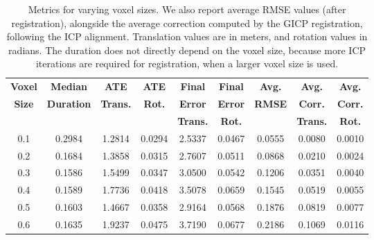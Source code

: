 \begin{table}[h]
    \centering
    \begin{tabular}{c|cccccccc}
        \hline
        \textbf{Voxel} & \textbf{Median}   & \textbf{ATE}    & \textbf{ATE}  & \textbf{Final } & \textbf{Final} & \textbf{Avg.} & \textbf{Avg.}   & \textbf{Avg.}  \\
        \textbf{Size}  & \textbf{Duration} & \textbf{Trans.} & \textbf{Rot.} & \textbf{Error}  & \textbf{Error} & \textbf{RMSE} & \textbf{Corr.}  & \textbf{Corr.} \\
                       &                   & \textbf{}       & \textbf{}     & \textbf{Trans.} & \textbf{Rot.}  & \textbf{}     & \textbf{Trans.} & \textbf{Rot.}  \\
        \hline
        \hline
        0.1            & 0.2984            & 1.2814          & 0.0294        & 2.5337          & 0.0467         & 0.0555        & 0.0080          & 0.0010         \\
        0.2            & 0.1684            & 1.3858          & 0.0315        & 2.7607          & 0.0511         & 0.0868        & 0.0210          & 0.0024         \\
        0.3            & 0.1586            & 1.5499          & 0.0347        & 3.0500          & 0.0542         & 0.1206        & 0.0351          & 0.0040         \\
        0.4            & 0.1589            & 1.7736          & 0.0418        & 3.5078          & 0.0659         & 0.1545        & 0.0519          & 0.0055         \\
        0.5            & 0.1603            & 1.4667          & 0.0358        & 2.9164          & 0.0568         & 0.1876        & 0.0819          & 0.0077         \\
        0.6            & 0.1635            & 1.9237          & 0.0475        & 3.7190          & 0.0677         & 0.2186        & 0.1069          & 0.0116         \\
        \hline
    \end{tabular}
    \caption{Metrics for varying voxel sizes. We also report average RMSE values (after registration), alongside the average correction computed by the GICP registration, following the ICP alignment. Translation values are in meters, and rotation values in radians. The duration does not directly depend on the voxel size, because more ICP iterations are required for registration, when a larger voxel size is used.}
    \label{tab:voxel_metrics}
\end{table}

